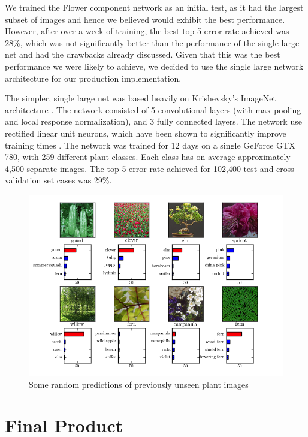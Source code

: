 \documentclass[a4paper,11pt]{article}
\begin{document}
\begin{description}
\hspace{5 mm} We trained the Flower component network as an initial test, as it had the largest subset of images and hence we believed would exhibit the best performance.  However, after over a week of training, the best top-5 error rate achieved was 28\%, which was not significantly better than the performance of the single large net and had the drawbacks already discussed. Given that this was the best performance we were likely to achieve, we decided to use the single large network architecture for our production implementation.

\hspace{5 mm} The simpler, single large net was based heavily on Krishevsky's ImageNet architecture \cite{cudaconv_2012}. The network consisted of 5 convolutional layers (with max pooling and local response normalization), and 3 fully connected layers. The network use rectified linear unit neurons, which have been shown to significantly improve training times \cite{cudaconv_2012}.  The network was trained for 12 days on a single GeForce GTX 780, with 259 different plant classes. Each class has on average approximately 4,500 separate images. The top-5 error rate achieved for 102,400 test and cross-validation set cases was 29\%.  

\begin{figure}[h!]
	\centering
	\includegraphics[width=1.0\linewidth]{preds.png}
	\caption{Some random predictions of previously unseen plant images}
        \label{fig:ml_preds}
\end{figure}

\section{Final Product}


\end{description}
\end{document}

